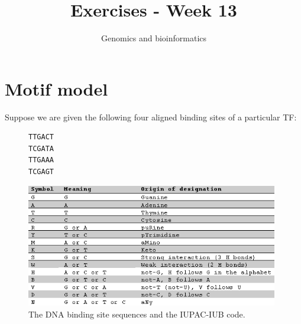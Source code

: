 \documentclass[a4paper,11pt]{article}
\begin{document}
\title{Exercises - Week 13}
\date{}
\author{Genomics and bioinformatics}
\maketitle

\section{Motif model}

\noindent Suppose we are given the following four aligned binding sites of a particular TF:

\begin{figure}[h!]
\centering
\begin{BVerbatim}
TTGACT
TCGATA
TTGAAA
TCGAGT
\end{BVerbatim}
\hspace{15mm}\includegraphics[width=11cm]{IUPAC.png}
\caption{The DNA binding site sequences and the IUPAC-IUB code.}
\end{figure}
\end{document}
